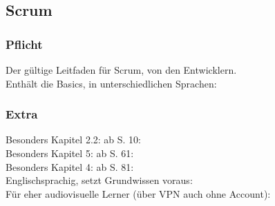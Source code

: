 \documentclass[12pt,a4paper]{report}
\begin{document}
\subsection*{Scrum}
\subsubsection*{Pflicht}
Der gültige Leitfaden für Scrum, von den Entwicklern. \\
Enthält die Basics, in unterschiedlichen Sprachen: \cite{ScrumGuide}
\subsubsection*{Extra}
Besonders Kapitel 2.2: ab S. 10: \cite{AgileITProjekte} \\
Besonders Kapitel 5: ab S. 61: \cite{AgileProzesse} \\
Besonders Kapitel 4: ab S. 81: \cite{ScrumSystem} \\
\nocite{ScrumUnternehmenspraxis}
Englischsprachig, setzt Grundwissen voraus: \cite{ScrumCulture}\\
Für eher audiovisuelle Lerner (über VPN auch ohne Account): \cite{VideoToBrain} 

\end{document}
